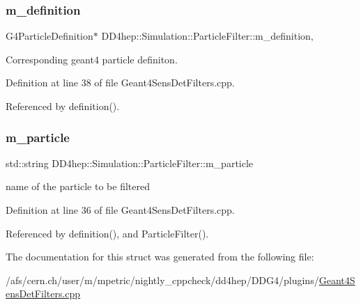 \subsubsection{\texorpdfstring{m\+\_\+definition}{m\_definition}}
{\footnotesize\ttfamily G4\+Particle\+Definition$\ast$ D\+D4hep\+::\+Simulation\+::\+Particle\+Filter\+::m\+\_\+definition\hspace{0.3cm}{\ttfamily [mutable]}, {\ttfamily [protected]}}



Corresponding geant4 particle definiton. 



Definition at line 38 of file Geant4\+Sens\+Det\+Filters.\+cpp.



Referenced by definition().

\hypertarget{struct_d_d4hep_1_1_simulation_1_1_particle_filter_a410c1fd6ed11ffb97571fdeac010d882}{}\label{struct_d_d4hep_1_1_simulation_1_1_particle_filter_a410c1fd6ed11ffb97571fdeac010d882} 
\subsubsection{\texorpdfstring{m\+\_\+particle}{m\_particle}}
{\footnotesize\ttfamily std\+::string D\+D4hep\+::\+Simulation\+::\+Particle\+Filter\+::m\+\_\+particle\hspace{0.3cm}{\ttfamily [protected]}}



name of the particle to be filtered 



Definition at line 36 of file Geant4\+Sens\+Det\+Filters.\+cpp.



Referenced by definition(), and Particle\+Filter().



The documentation for this struct was generated from the following file\+:\begin{DoxyCompactItemize}
\item 
/afs/cern.\+ch/user/m/mpetric/nightly\+\_\+cppcheck/dd4hep/\+D\+D\+G4/plugins/\hyperlink{_geant4_sens_det_filters_8cpp}{Geant4\+Sens\+Det\+Filters.\+cpp}\end{DoxyCompactItemize}
